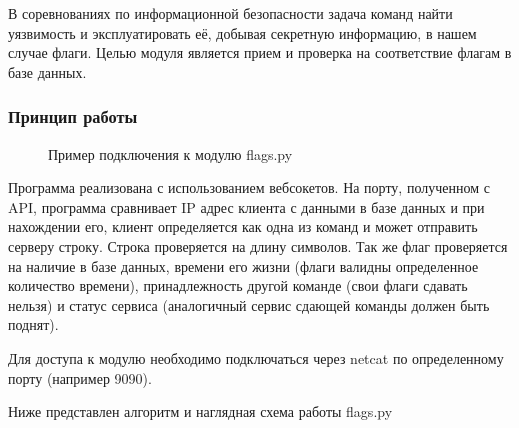 В соревнованиях по информационной безопасности задача команд найти уязвимость и эксплуатировать её, добывая секретную информацию, в нашем случае флаги. Целью модуля является прием и проверка на соответствие флагам в базе данных.

\subsubsection{Принцип работы}

\begin{figure}[h!]
\caption{Пример подключения к модулю flags.py}
\end{figure}

Программа реализована с использованием вебсокетов. На порту, полученном с API, программа сравнивает IP адрес клиента с данными в базе данных и при нахождении его, клиент определяется как одна из команд и может отправить серверу строку. Строка проверяется на длину символов. Так же флаг проверяется на наличие в базе данных, времени его жизни (флаги валидны определенное количество времени), принадлежность другой команде (свои флаги сдавать нельзя) и статус сервиса (аналогичный сервис сдающей команды должен быть поднят). 

Для доступа к модулю необходимо подключаться через netcat по определенному порту (например 9090).

Ниже представлен алгоритм и наглядная схема работы flags.py

